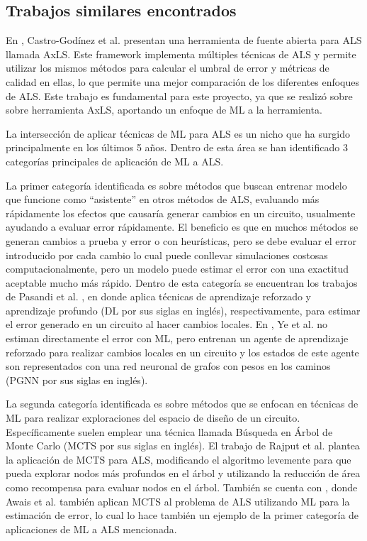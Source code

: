 \subsection{Trabajos similares encontrados}

En \cite{castro-godinez_axls_2021}, Castro-Godínez et al. presentan una
herramienta de fuente abierta para ALS llamada AxLS. Este framework implementa
múltiples técnicas de ALS y permite utilizar los mismos métodos para calcular
el umbral de error y métricas de calidad en ellas, lo que permite una mejor
comparación de los diferentes enfoques de ALS. Este trabajo es fundamental para
este proyecto, ya que se realizó sobre sobre herramienta AxLS, aportando un
enfoque de ML a la herramienta.

La intersección de aplicar técnicas de ML para ALS es un nicho que ha surgido
principalmente en los últimos 5 años. Dentro de esta área se han identificado 3
categorías principales de aplicación de ML a ALS.

La primer categoría identificada es sobre métodos que buscan entrenar modelo
que funcione como ``asistente'' en otros métodos de ALS, evaluando más
rápidamente los efectos que causaría generar cambios en un circuito, usualmente
ayudando a evaluar error rápidamente. El beneficio es que en muchos métodos se
generan cambios a prueba y error o con heurísticas, pero se debe evaluar el
error introducido por cada cambio lo cual puede conllevar simulaciones costosas
computacionalmente, pero un modelo puede estimar el error con una exactitud
aceptable mucho más rápido. Dentro de esta categoría se encuentran los trabajos
de Pasandi et al. \cite{pasandi_approximate_2019}
\cite{pasandi_deep-powerx_2020}, en donde aplica técnicas de aprendizaje
reforzado y aprendizaje profundo (DL por sus siglas en inglés),
respectivamente, para estimar el error generado en un circuito al hacer cambios
locales. En \cite{ye_timing-driven_2024}, Ye et al. no estiman directamente el
error con ML, pero entrenan un agente de aprendizaje reforzado para realizar
cambios locales en un circuito y los estados de este agente son representados
con una red neuronal de grafos con pesos en los caminos (PGNN por sus siglas en
inglés).

La segunda categoría identificada es sobre métodos que se enfocan en técnicas
de ML para realizar exploraciones del espacio de diseño de un circuito.
Específicamente suelen emplear una técnica llamada Búsqueda en Árbol de Monte
Carlo (MCTS por sus siglas en inglés). El trabajo de Rajput et al.
\cite{rajput_improved_2023} plantea la aplicación de MCTS para ALS, modificando
el algoritmo levemente para que pueda explorar nodos más profundos en el árbol
y utilizando la reducción de área como recompensa para evaluar nodos en el
árbol. También se cuenta con \cite{awais_deepapprox_2024}, donde Awais et al.
también aplican MCTS al problema de ALS utilizando ML para la estimación de
error, lo cual lo hace también un ejemplo de la primer categoría de
aplicaciones de ML a ALS mencionada.

